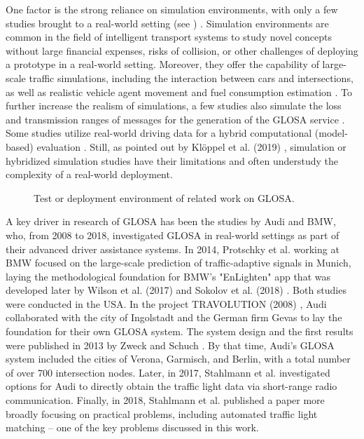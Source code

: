 One factor is the strong reliance on simulation environments, with only a few studies brought to a real-world setting (see ) \cite{mellegard_day_2020}. Simulation environments are common in the field of intelligent transport systems to study novel concepts without large financial expenses, risks of collision, or other challenges of deploying a prototype in a real-world setting. Moreover, they offer the capability of  large-scale traffic simulations, including the interaction between cars and intersections, as well as realistic vehicle agent movement and fuel consumption estimation \cite{kloeppel_performance_2019, pariota_green_2019}. To further increase the realism of simulations, a few studies also simulate the loss and transmission ranges of messages for the generation of the GLOSA service \cite{sharara_impact_2019}. Some studies utilize real-world driving data for a hybrid computational (model-based) evaluation \cite{raubitschek_predictive_2011, luo_green_2017, xie_dynamic_2021, bhattacharyya_assessing_2022}. Still, as pointed out by Klöppel et al. (2019) \cite{kloeppel_performance_2019}, simulation or hybridized simulation studies have their limitations and often understudy the complexity of a real-world deployment.

\begin{figure}
\centering
\resizebox{\linewidth}{!}{%

}
\caption{Test or deployment environment of related work on GLOSA.}
\label{fig:related-work-piechart}
\end{figure}

A key driver in research of GLOSA has been the studies by Audi and BMW, who, from 2008 to 2018, investigated GLOSA in real-world settings as part of their advanced driver assistance systems. In 2014, Protschky et al. \cite{protschky_extensive_2014, protschky_adaptive_2014} working at BMW focused on the large-scale prediction of traffic-adaptive signals in Munich, laying the methodological foundation for BMW's "EnLighten" app that was developed later by Wilson et al. (2017) \cite{wilson_driver_2017} and Sokolov et al. (2018) \cite{sokolov_effects_2018}. Both studies were conducted in the USA. In the project TRAVOLUTION (2008) \cite{braun_travolution-netzweite_2009}, Audi collaborated with the city of Ingolstadt and the German firm Gevas to lay the foundation for their own GLOSA system. The system design and the first results were published in 2013 by Zweck and Schuch \cite{zweck_traffic_2013}. By that time, Audi's GLOSA system included the cities of Verona, Garmisch, and Berlin, with a total number of over 700 intersection nodes. Later, in 2017, Stahlmann et al. \cite{stahlmann_multi-hop_2017} investigated options for Audi to directly obtain the traffic light data via short-range radio communication. Finally, in 2018, Stahlmann et al. \cite{stahlmann_exploring_2018} published a paper more broadly focusing on practical problems, including automated traffic light matching -- one of the key problems discussed in this work.

